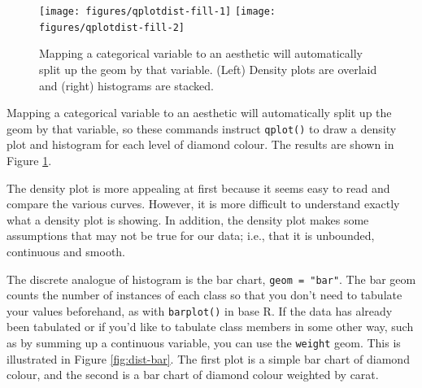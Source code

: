 \begin{figure}

{\centering \texttt{[image: figures/qplotdist-fill-1]} \texttt{[image: figures/qplotdist-fill-2]} 

}

\caption{Mapping a categorical variable to an aesthetic will automatically split up the geom by that variable.  (Left) Density plots are overlaid and (right) histograms are stacked.\label{fig:dist-fill}}
\end{figure}

\noindent Mapping a categorical variable to an aesthetic will
automatically split up the geom by that variable, so these commands
instruct \texttt{qplot()} to draw a density plot and histogram for each
level of diamond colour. The results are shown in Figure
\ref{fig:dist-fill}.

The density plot is more appealing at first because it seems easy to
read and compare the various curves. However, it is more difficult to
understand exactly what a density plot is showing. In addition, the
density plot makes some assumptions that may not be true for our data;
i.e., that it is unbounded, continuous and smooth.


The discrete analogue of histogram is the bar chart,
\texttt{geom = "bar"}. The bar geom counts the number of instances of
each class so that you don't need to tabulate your values beforehand, as
with \texttt{barplot()} in base R. If the data has already been
tabulated or if you'd like to tabulate class members in some other way,
such as by summing up a continuous variable, you can use the
\texttt{weight} geom. This is illustrated in Figure \ref{fig:dist-bar}.
The first plot is a simple bar chart of diamond colour, and the second
is a bar chart of diamond colour weighted by carat. 

\begin{Shaded}
\begin{Highlighting}[]
  \NormalTok{)}
  \NormalTok{, } 
\StringTok{  }\NormalTok{(}\NormalTok{)}
\end{Highlighting}
\end{Shaded}


